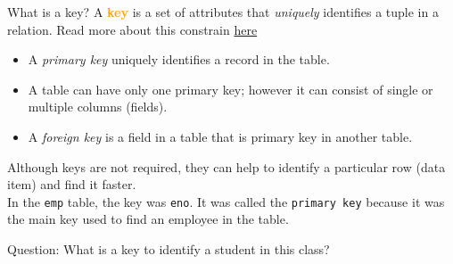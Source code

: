 \documentclass[xcolor=svgnames]{beamer}
\newcommand{\nl}{\\[1em]}
\newcommand{\define}[1]{\textbf{\textcolor{orange}{#1}}}
\theoremstyle{example}
\begin{document}
\begin{frame}{What is a key?}
A \define{key} is a set of attributes that \emph{uniquely} identifies a tuple in a relation. Read more about this constrain \href{https://www.w3schools.com/sql/sql_primarykey.asp}{here}
\begin{itemize}
\item A \emph{primary key} uniquely identifies a record in the table. 
\item A table can have only \alert{one} primary key; however it can consist of single or multiple columns (fields).
\item A \emph{foreign key} is a field in a table that is primary key in another table. 
\end{itemize}


Although keys are not required, they can help to identify a particular row (data item) and find it faster.\nl

In the {\tt emp} table, the key was {\tt eno}.  It was called the {\tt primary key} because it was the main key used to find an employee in the table.\nl

\begin{exampleblock}
{Question:}
What is a key to identify a student in this class?
\end{exampleblock}


\end{frame}
%
%
%
\end{document}
